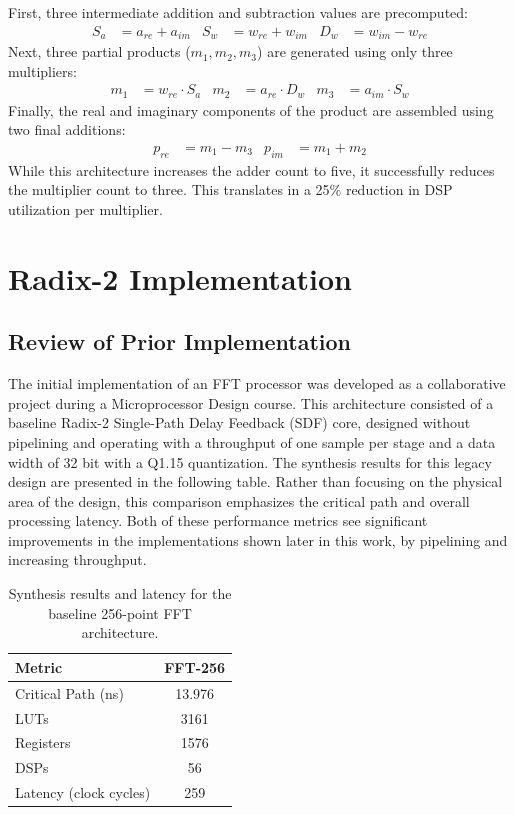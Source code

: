 First, three intermediate addition and subtraction values are precomputed:
\begin{align}
    S_a &= a_{re} + a_{im} & S_w &= w_{re} + w_{im} & D_w &= w_{im} - w_{re}
\end{align}
Next, three partial products ($m_1, m_2, m_3$) are generated using only three multipliers:
\begin{align}
    m_1 &= w_{re} \cdot S_a & m_2 &= a_{re} \cdot D_w & m_3 &= a_{im} \cdot S_w
\end{align}
Finally, the real and imaginary components of the product are assembled using two final additions:
\begin{align}
    p_{re} &= m_1 - m_3 & p_{im} &= m_1 + m_2
\end{align}
While this architecture increases the adder count to five, it successfully reduces the multiplier count to three. This translates in a 25\% reduction in DSP utilization per multiplier.

\section{Radix-2 Implementation}
\subsection{Review of Prior Implementation}
The initial implementation of an FFT processor was developed as a collaborative project during a Microprocessor Design course. This architecture consisted of a baseline Radix-2 Single-Path Delay Feedback (SDF) core, designed without pipelining and operating with a throughput of one sample per stage and a data width of 32 bit with a Q1.15 quantization. The synthesis results for this legacy design are presented in the following table. Rather than focusing on the physical area of the design, this comparison emphasizes the critical path and overall processing latency. Both of these performance metrics see significant improvements in the  implementations shown later in this work, by pipelining and increasing throughput.

\begin{table}[htbp]
    \centering
    \caption{Synthesis results and latency for the baseline 256-point FFT architecture.}
    \vspace{0.5em}
    \begin{tabular}{lc}
        \hline
        \textbf{Metric} & \textbf{FFT-256} \\
        \hline
        Critical Path (ns) & 13.976 \\
        LUTs & 3161 \\
        Registers & 1576 \\
        DSPs & 56 \\
        Latency (clock cycles) & 259 \\
        \hline
    \end{tabular}
    \label{tab:baseline_results_256}
\end{table}

